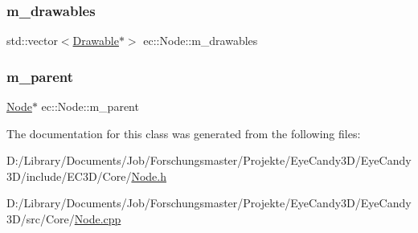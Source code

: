\mbox{\label{classec_1_1_node_aa9f624971a4906674148117ba4442c01}} 
\subsubsection{\texorpdfstring{m\+\_\+drawables}{m\_drawables}}
{\footnotesize\ttfamily std\+::vector$<$\mbox{\hyperlink{classec_1_1_drawable}{Drawable}}$\ast$$>$ ec\+::\+Node\+::m\+\_\+drawables\hspace{0.3cm}{\ttfamily [protected]}}

\mbox{\label{classec_1_1_node_a9f5373bd3ba5bfed53894223adcfe791}} 
\subsubsection{\texorpdfstring{m\+\_\+parent}{m\_parent}}
{\footnotesize\ttfamily \mbox{\hyperlink{classec_1_1_node}{Node}}$\ast$ ec\+::\+Node\+::m\+\_\+parent\hspace{0.3cm}{\ttfamily [protected]}}



The documentation for this class was generated from the following files\+:\begin{DoxyCompactItemize}
\item 
D\+:/\+Library/\+Documents/\+Job/\+Forschungsmaster/\+Projekte/\+Eye\+Candy3\+D/\+Eye\+Candy3\+D/include/\+E\+C3\+D/\+Core/\mbox{\hyperlink{_node_8h}{Node.\+h}}\item 
D\+:/\+Library/\+Documents/\+Job/\+Forschungsmaster/\+Projekte/\+Eye\+Candy3\+D/\+Eye\+Candy3\+D/src/\+Core/\mbox{\hyperlink{_node_8cpp}{Node.\+cpp}}\end{DoxyCompactItemize}
